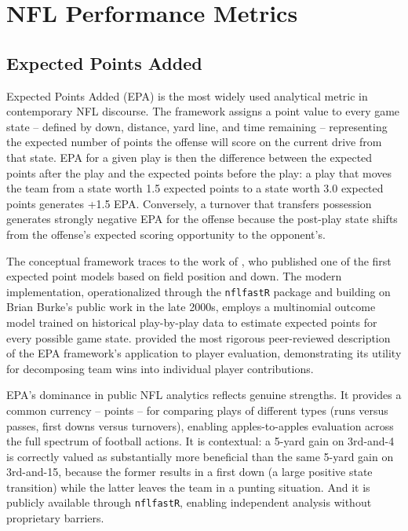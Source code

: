 \section{NFL Performance Metrics}
\label{sec:nfl-metrics}

\subsection{Expected Points Added}
\label{sec:epa-framework}

Expected Points Added (EPA) is the most widely used analytical metric in contemporary NFL discourse. The framework assigns a point value to every game state  -- defined by down, distance, yard line, and time remaining  -- representing the expected number of points the offense will score on the current drive from that state. EPA for a given play is then the difference between the expected points after the play and the expected points before the play: a play that moves the team from a state worth 1.5 expected points to a state worth 3.0 expected points generates +1.5 EPA. Conversely, a turnover that transfers possession generates strongly negative EPA for the offense because the post-play state shifts from the offense's expected scoring opportunity to the opponent's.

The conceptual framework traces to the work of \textcite{carter1971operations}, who published one of the first expected point models based on field position and down. The modern implementation, operationalized through the \texttt{nflfastR} package \parencite{carl2021nflfastr} and building on Brian Burke's public work in the late 2000s, employs a multinomial outcome model trained on historical play-by-play data to estimate expected points for every possible game state. \textcite{yurko2019nflwar} provided the most rigorous peer-reviewed description of the EPA framework's application to player evaluation, demonstrating its utility for decomposing team wins into individual player contributions.

EPA's dominance in public NFL analytics reflects genuine strengths. It provides a common currency  -- points  -- for comparing plays of different types (runs versus passes, first downs versus turnovers), enabling apples-to-apples evaluation across the full spectrum of football actions. It is contextual: a 5-yard gain on 3rd-and-4 is correctly valued as substantially more beneficial than the same 5-yard gain on 3rd-and-15, because the former results in a first down (a large positive state transition) while the latter leaves the team in a punting situation. And it is publicly available through \texttt{nflfastR}, enabling independent analysis without proprietary barriers.

